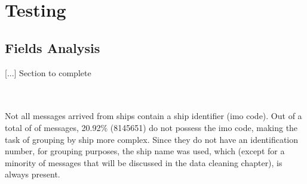 \chapter{Testing}
\label{ch:testing}

\section{Fields Analysis}

[...] Section to complete

\\

\\
Not all messages arrived from ships contain a ship identifier (imo code). Out of a total of  of messages, 20.92\% (8145651) do not possess the imo code, making the task of grouping by ship more complex.
Since they do not have an identification number, for grouping purposes, the ship name was used, which (except for a minority of messages that will be discussed in the data cleaning chapter), is always present.